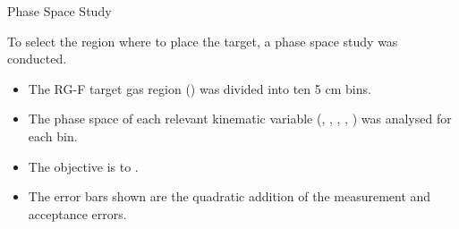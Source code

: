 \begin{frame}{Phase Space Study}
    \label{12.11::summary}

    To select the region where to place the target, a phase space study was conducted.

    \vspace{12pt}
    \begin{itemize}
        \item
            The RG-F target gas region () was divided into ten 5 cm bins.

        \vspace{6pt}
        \item
            The phase space of each relevant kinematic variable (, \ef{$\nu$}, , , ) was analysed for each bin.

        \vspace{6pt}
        \item
            The objective is to .

        \vspace{6pt}
        \item
            The error bars shown are the quadratic addition of the measurement and acceptance errors.
    \end{itemize}
\end{frame}

